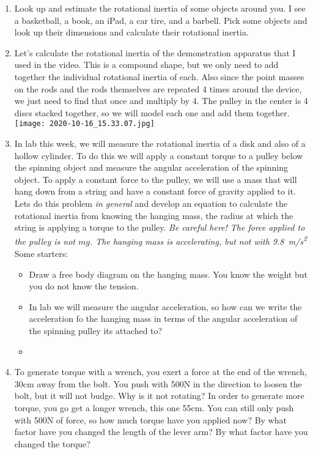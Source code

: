 \begin{enumerate}
	\item 
	Look up and estimate the rotational inertia of some objects around you. I see a basketball, a book, an iPad, a car tire, and a barbell. Pick some objects and look up their dimensions and calculate their rotational inertia.
	
	\item
	Let's calculate the rotational inertia of the demonstration apparatus that I used in the video.
	This is a compound shape, but we only need to add together the individual rotational inertia of each. Also since the point masses on the rods and the rods themselves are repeated 4 times around the device, we just need to find that once and multiply by 4. The pulley in the center is 4 discs stacked together, so we will model each one and add them together.\\
	
	\texttt{[image: 2020-10-16\_15.33.07.jpg]}
	
	\item
	In lab this week, we will measure the rotational inertia of a disk and also of a hollow cylinder. To do this we will apply a constant torque to a pulley below the spinning object and measure the angular acceleration of the spinning object. To apply a constant force to the pulley, we will use a mass that will hang down from a string and have a constant force of gravity applied to it. Lets do this problem \emph{in general} and develop an equation to calculate the rotational inertia from knowing the hanging mass, the radius at which the string is applying a torque to the pulley. \emph{Be careful here! The force applied to the pulley is not $mg$. The hanging mass is accelerating, but not with \SI{9.8}{m/s^2}}\\
	Some starters:
	\begin{itemize}
		\item Draw a free body diagram on the hanging mass. You know the weight but you do not know the tension. 
		\item In lab we will measure the angular acceleration, so how can we write the acceleration fo the hanging mass in terms of the angular acceleration of the spinning pulley its attached to?
		\item 
	\end{itemize}
	\giantskip
	
	\item
	To generate torque with a wrench, you exert a force at the end of the wrench, 30cm away from the bolt. You push with 500N in the direction to loosen the bolt, but it will not budge. Why is it not rotating? In order to generate more torque, you go get a longer wrench, this one 55cm. You can still only push with 500N of force, so how much torque have you applied now? By what factor have you changed the length of the lever arm? By what factor have you changed the torque?\hugeskip
	

\end{enumerate}

